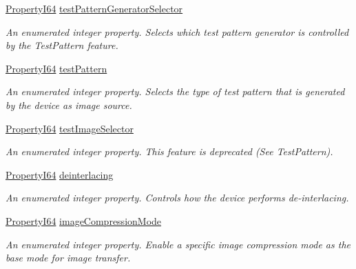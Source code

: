 \begin{DoxyCompactItemize}
\hyperlink{group___common_interface_ga81749b2696755513663492664a18a893}{Property\+I64} \hyperlink{classmv_i_m_p_a_c_t_1_1acquire_1_1_gen_i_cam_1_1_image_format_control_af1008e10eaea4f9fe5a93410883543de}{test\+Pattern\+Generator\+Selector}
\begin{DoxyCompactList}\small\item\em An enumerated integer property. Selects which test pattern generator is controlled by the Test\+Pattern feature. \end{DoxyCompactList}\item 
\hyperlink{group___common_interface_ga81749b2696755513663492664a18a893}{Property\+I64} \hyperlink{classmv_i_m_p_a_c_t_1_1acquire_1_1_gen_i_cam_1_1_image_format_control_a34c6fda7818b0225f41f1cbca82cb8cd}{test\+Pattern}
\begin{DoxyCompactList}\small\item\em An enumerated integer property. Selects the type of test pattern that is generated by the device as image source. \end{DoxyCompactList}\item 
\hyperlink{group___common_interface_ga81749b2696755513663492664a18a893}{Property\+I64} \hyperlink{classmv_i_m_p_a_c_t_1_1acquire_1_1_gen_i_cam_1_1_image_format_control_a34aeaf5d248f18129d9c3751c6b2fa24}{test\+Image\+Selector}
\begin{DoxyCompactList}\small\item\em An enumerated integer property. This feature is deprecated (See Test\+Pattern). \end{DoxyCompactList}\item 
\hyperlink{group___common_interface_ga81749b2696755513663492664a18a893}{Property\+I64} \hyperlink{classmv_i_m_p_a_c_t_1_1acquire_1_1_gen_i_cam_1_1_image_format_control_a4a1e64f8caa06a00302a3a77d9206e16}{deinterlacing}
\begin{DoxyCompactList}\small\item\em An enumerated integer property. Controls how the device performs de-\/interlacing. \end{DoxyCompactList}\item 
\hyperlink{group___common_interface_ga81749b2696755513663492664a18a893}{Property\+I64} \hyperlink{classmv_i_m_p_a_c_t_1_1acquire_1_1_gen_i_cam_1_1_image_format_control_ab8c0807f112b80394f607bf8c7975bd9}{image\+Compression\+Mode}
\begin{DoxyCompactList}\small\item\em An enumerated integer property. Enable a specific image compression mode as the base mode for image transfer. \end{DoxyCompactList}\item 

\end{DoxyCompactItemize}
